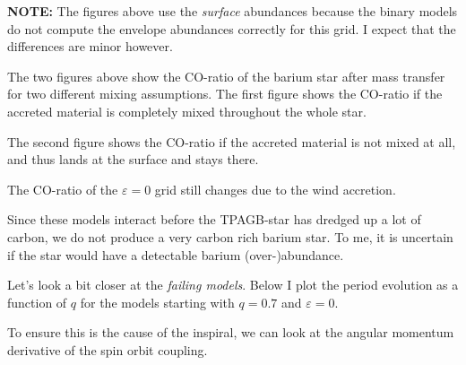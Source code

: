 \documentclass[a4paper,10pt]{article}
\begin{document}
\begin{figure}[ht]
    \centering
\end{figure}

\begin{figure}[ht]
    \centering
\end{figure}

\begin{questionbox}{}{}
\textbf{\textcolor{keywordscolor}{NOTE:}}
    The figures above use the \emph{surface} abundances because the binary models do not compute the envelope abundances correctly for this grid. I expect that the differences are minor however.
\end{questionbox}

The two figures above show the CO-ratio of the barium star after mass transfer for two different mixing assumptions. The first figure shows the CO-ratio if the accreted material is completely mixed throughout the whole star.

The second figure shows the CO-ratio if the accreted material is not mixed at all, and thus lands at the surface and stays there.

The CO-ratio of the \(\varepsilon =0\) grid still changes due to the wind accretion.

Since these models interact before the TPAGB-star has dredged up a lot of carbon, we do not produce a very carbon rich barium star. To me, it is uncertain if the star would have a detectable barium (over-)abundance.

\nextpage
Let's look a bit closer at the \emph{failing models}. Below I plot the period evolution as a function of \(q\) for the models starting with \(q=0.7\) and \(\varepsilon = 0\). 
\begin{figure}[ht]
    \centering
\end{figure}

To ensure this is the cause of the inspiral, we can look at the angular momentum derivative of the spin orbit coupling.
\begin{figure}[ht]
    \centering
\end{figure}
\end{document}
